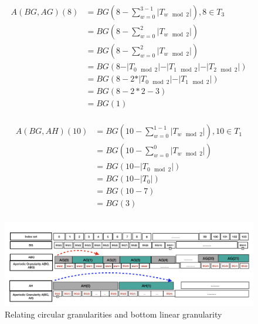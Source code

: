\documentclass[12pt]{article}
\begin{document}
\begin{equation} \label{eq:eq4}
\begin{split}
A(BG,AG)(8) & = BG(8 - \sum_{w=0}^{3-1}\vert T_{w \mod 2}\vert) , 8 \in T_{3} \\
  & = BG(8 - \sum_{w=0}^{2}\vert T_{w\mod 2}\vert) \\
  & = BG(8 - \sum_{w=0}^{2}\vert T_{w\mod 2}\vert) \\
  & = BG(8 - \vert T_{0 \mod 2}\vert - \vert T_{1 \mod 2}\vert - \vert T_{2 \mod 2}\vert) \\
  & = BG(8 - 2*\vert T_{0 \mod 2}\vert - \vert T_{1 \mod 2}\vert) \\
  & = BG(8 - 2*2 - 3) \\
  & = BG(1) \\
\end{split}
\end{equation}

\begin{equation} \label{eq:eq5}
\begin{split}
A(BG,AH)(10) & = BG(10 - \sum_{w=0}^{1-1}\vert T_{w \mod 2}\vert) ,  10 \in T_{1}  \\
  & = BG(10 - \sum_{w=0}^{0}\vert T_{w\mod 2}\vert) \\
  & = BG(10 - \vert T_{0 \mod 2}\vert) \\
  & = BG(10 - \vert T_{0}\vert) \\
  & = BG(10 - 7) \\
  & = BG(3) \\
\end{split}
\end{equation}

\begin{figure}

{\centering \includegraphics[width=1\linewidth]{Figs/aperiodic-granv1} 

}

\caption{Relating circular granularities and bottom linear granularity }\label{fig:aperiodic-gran}
\end{figure}
\end{document}

